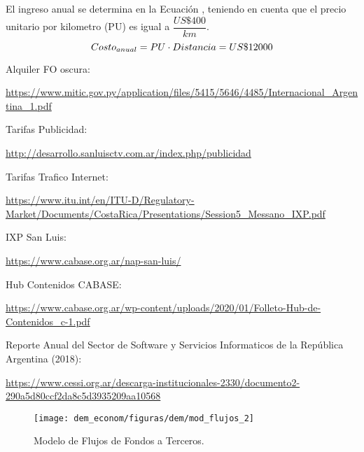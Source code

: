 El ingreso anual se determina en la Ecuación , teniendo en cuenta que el precio unitario por kilometro (PU) es igual a $\dfrac{US\$ 400}{km}$.
\begin{equation}
 Costo_{anual} = PU \cdot Distancia \\ 
 = US\$ 12000
\end{equation}









\begin{thebibliography}{99}
 Alquiler FO oscura: \begin{tiny}
\url{https://www.mitic.gov.py/application/files/5415/5646/4485/Internacional_Argentina_1.pdf}
\end{tiny}

 Tarifas Publicidad: \begin{tiny}
\url{http://desarrollo.sanluisctv.com.ar/index.php/publicidad}
\end{tiny}

 Tarifas Trafico Internet: \begin{tiny}
\url{https://www.itu.int/en/ITU-D/Regulatory-Market/Documents/CostaRica/Presentations/Session5_Messano_IXP.pdf}
\end{tiny}

 IXP San Luis:
\begin{tiny}
\url{https://www.cabase.org.ar/nap-san-luis/}
\end{tiny}

 Hub Contenidos CABASE:
\begin{tiny}
\url{https://www.cabase.org.ar/wp-content/uploads/2020/01/Folleto-Hub-de-Contenidos_c-1.pdf}
\end{tiny}

 Reporte Anual del Sector de Software y Servicios Informaticos de la República Argentina (2018):


\begin{tiny}
\url{https://www.cessi.org.ar/descarga-institucionales-2330/documento2-290a5d80ccf2da8c5d3935209aa10568}
\end{tiny}

\end{thebibliography}


 \begin{figure}[H]
	 \centering
	 \texttt{[image: dem\_econom/figuras/dem/mod\_flujos\_2]}
	 \caption{Modelo de Flujos de Fondos a Terceros.}
	 \label{dem-figuras:mod_flujos}

 \end{figure}


